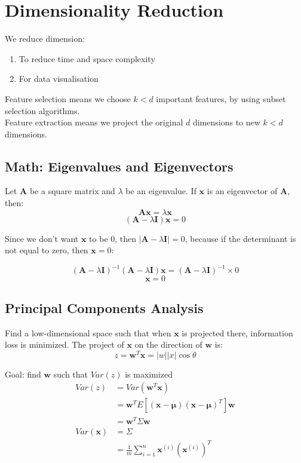 \chapter{Dimensionality Reduction}

\begin{multicols}{2}
\noindent We reduce dimension:
\begin{enumerate}
    \item To reduce time and space complexity
    \item For data visualisation 
\end{enumerate}

\noindent Feature selection means we choose $k<d$ important features, by using subset selection algorithms. \\

\noindent Feature extraction means we project the original $d$ dimensions to new $k<d$ dimensions.

\section{Math: Eigenvalues and Eigenvectors}

\noindent Let $\mathbf{A}$ be a square matrix and $\lambda$ be an eigenvalue. If $\mathbf{x}$ is an eigenvector of $\mathbf{A}$, then:
$$\mathbf{Ax} = \lambda \mathbf{x}$$ 
$$(\mathbf{A}-\lambda \mathbf{I})\mathbf{x} = 0$$

\noindent Since we don't want $\mathbf{x}$ to be 0, then $|\mathbf{A} - \lambda \mathbf{I}|=0$, because if the determinant is not equal to zero, then $\mathbf{x} = 0$:

$$(\mathbf{A}-\lambda \mathbf{I})^{-1}(\mathbf{A}-\lambda \mathbf{I})\mathbf{x} = (\mathbf{A}-\lambda \mathbf{I})^{-1} \times 0$$
$$\mathbf{x} = 0$$

\section{Principal Components Analysis}

\noindent Find a low-dimensional space such that when $\mathbf{x}$ is projected there, information loss is minimized. The project of $\mathbf{x}$ on the direction of $\mathbf{w}$ is:
$$z=\mathbf{w}^{T}\mathbf{x}=|w||x| \cos \theta$$

\noindent Goal: find $\mathbf{w}$ such that $Var(z)$ is maximized
\begin{equation*}
\begin{split}
    Var(z) &= Var(\mathbf{w}^{T}\mathbf{x}) \\
    &= \mathbf{w}^{T} E[(\mathbf{x}-\mathbf{\mu})(\mathbf{x}-\mathbf{\mu})^{T}] \mathbf{w} \\
    &= \mathbf{w}^{T} \Sigma \mathbf{w}\\
    Var(\mathbf{x}) &= \Sigma \\
    &= \frac{1}{m} \sum_{i=1}^n \mathbf{x}^{(i)} (\mathbf{x}^{(i)})^{T}
\end{split}
\end{equation*}


\end{multicols}
